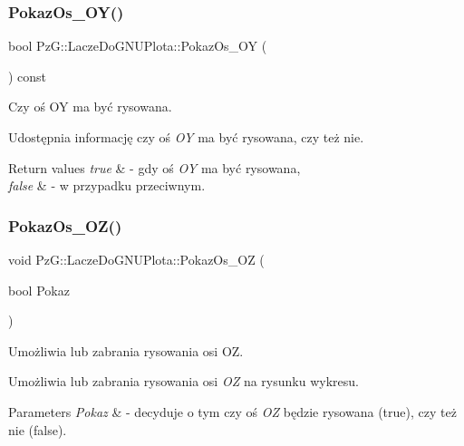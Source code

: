 \subsubsection{\texorpdfstring{Pokaz\+Os\+\_\+\+O\+Y()}{PokazOs\_OY()}\hspace{0.1cm}{\footnotesize\ttfamily [2/2]}}
{\footnotesize\ttfamily bool Pz\+G\+::\+Lacze\+Do\+G\+N\+U\+Plota\+::\+Pokaz\+Os\+\_\+\+OY (\begin{DoxyParamCaption}{ }\end{DoxyParamCaption}) const\hspace{0.3cm}{\ttfamily [inline]}}



Czy oś OY ma być rysowana. 

Udostępnia informację czy oś {\itshape OY} ma być rysowana, czy też nie. 
\begin{DoxyRetVals}{Return values}
{\em true} & -\/ gdy oś {\itshape OY} ma być rysowana, \\
\hline
{\em false} & -\/ w przypadku przeciwnym. \\
\hline
\end{DoxyRetVals}
\mbox{\label{classPzG_1_1LaczeDoGNUPlota_a9fabfe88cb1801a5de8923f45f514b99}} 
\subsubsection{\texorpdfstring{Pokaz\+Os\+\_\+\+O\+Z()}{PokazOs\_OZ()}\hspace{0.1cm}{\footnotesize\ttfamily [1/2]}}
{\footnotesize\ttfamily void Pz\+G\+::\+Lacze\+Do\+G\+N\+U\+Plota\+::\+Pokaz\+Os\+\_\+\+OZ (\begin{DoxyParamCaption}\item[{bool}]{Pokaz }\end{DoxyParamCaption})\hspace{0.3cm}{\ttfamily [inline]}}



Umożliwia lub zabrania rysowania osi OZ. 

Umożliwia lub zabrania rysowania osi {\itshape OZ} na rysunku wykresu. 
\begin{DoxyParams}{Parameters}
{\em Pokaz} & -\/ decyduje o tym czy oś {\itshape OZ} będzie rysowana ({\ttfamily true}), czy też nie ({\ttfamily false}). \\
\hline
\end{DoxyParams}
\mbox{\label{classPzG_1_1LaczeDoGNUPlota_a22c708af33c57bf3b5d1b4e82b4017b7}} 
